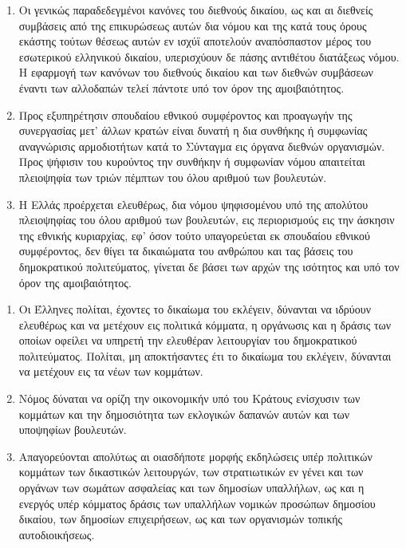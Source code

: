 \documentclass[twoside, a4paper, 10pt]{article}
\begin{document}
\begin{multicols}{2}
\begin{enumerate}
\begin{BigQuote}
\begin{enumerate}
  \item[1.] Οι γενικώς παραδεδεγμένοι κανόνες του διεθνούς δικαίου, ως και αι διεθνείς συμβάσεις από της επικυρώσεως αυτών δια νόμου και της κατά τους όρους εκάστης τούτων θέσεως αυτών εν ισχύϊ αποτελούν αναπόσπαστον μέρος του εσωτερικού ελληνικού δικαίου, υπερισχύουν δε πάσης αντιθέτου διατάξεως νόμου. Η εφαρμογή των κανόνων του διεθνούς δικαίου και των διεθνών συμβάσεων έναντι των αλλοδαπών τελεί πάντοτε υπό τον όρον της αμοιβαιότητος.
  \item[2.] Προς εξυπηρέτησιν σπουδαίου εθνικού συμφέροντος και προαγωγήν της συνεργασίας μετ' άλλων κρατών είναι δυνατή  η δια συνθήκης ή συμφωνίας αναγνώρισις αρμοδιοτήτων κατά το Σύνταγμα εις όργανα διεθνών οργανισμών. Προς ψήφισιν του κυρούντος την συνθήκην ή συμφωνίαν νόμου απαιτείται πλειοψηφία των τριών πέμπτων του όλου αριθμού των βουλευτών.
  \item[3.] Η Ελλάς προέρχεται ελευθέρως, δια νόμου ψηφισομένου υπό της απολύτου πλειοψηφίας του όλου αριθμού των βουλευτών, εις περιορισμούς εις την άσκησιν της εθνικής κυριαρχίας, εφ' όσον τούτο υπαγορεύεται εκ σπουδαίου εθνικού συμφέροντος, δεν θίγει τα δικαιώματα του ανθρώπου και τας βάσεις του δημοκρατικού πολιτεύματος, γίνεται δε βάσει των αρχών της ισότητος και υπό τον όρον της αμοιβαιότητος.
\end{enumerate}

\begin{enumerate}
  \item[1.] Οι Έλληνες πολίται, έχοντες το δικαίωμα του εκλέγειν, δύνανται να ιδρύουν ελευθέρως και να μετέχουν εις πολιτικά κόμματα, η οργάνωσις και η δράσις των οποίων οφείλει να υπηρετή την ελευθέραν λειτουργίαν του δημοκρατικού πολιτεύματος.
Πολίται, μη αποκτήσαντες έτι το δικαίωμα του εκλέγειν, δύνανται να μετέχουν εις τα νέων των κομμάτων.
  \item[2.] Νόμος δύναται να ορίζη την οικονομικήν υπό του Κράτους ενίσχυσιν των κομμάτων και την δημοσιότητα των εκλογικών δαπανών αυτών και των υποψηφίων βουλευτών.
  \item[3.] Απαγορεύονται απολύτως  αι οιασδήποτε μορφής εκδηλώσεις υπέρ πολιτικών κομμάτων των δικαστικών λειτουργών, των στρατιωτικών εν γένει  και των οργάνων των σωμάτων ασφαλείας και των δημοσίων υπαλλήλων, ως και η ενεργός υπέρ κόμματος δράσις των υπαλλήλων νομικών προσώπων δημοσίου δικαίου, των δημοσίων επιχειρήσεων, ως και των οργανισμών τοπικής αυτοδιοικήσεως.
\end{enumerate}


\end{BigQuote}
\end{enumerate}
\end{multicols}
\end{document}
